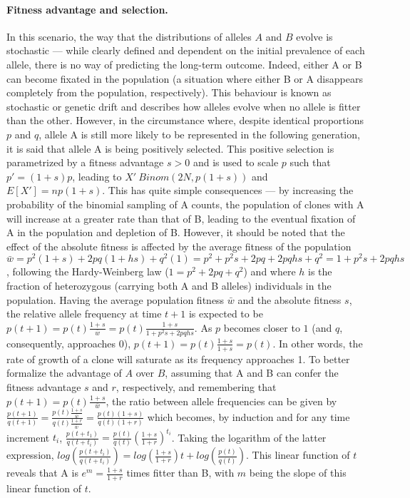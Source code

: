 \paragraph{Fitness advantage and selection.} In this scenario, the way that the distributions of alleles $A$ and $B$ evolve is stochastic --- while clearly defined and dependent on the initial prevalence of each allele, there is no way of predicting the long-term outcome. Indeed, either A or B can become fixated in the population (a situation where either B or A disappears completely from the population, respectively). This behaviour is known as stochastic or genetic drift and describes how alleles evolve when no allele is fitter than the other. However, in the circumstance where, despite identical proportions $p$ and $q$, allele A is still more likely to be represented in the following generation, it is said that allele A is being positively selected. This positive selection is parametrized by a fitness advantage $s > 0$ and is used to scale $p$ such that $p' = (1+s)p$, leading to $X' ~ Binom(2N,p(1+s))$ and $E[X'] = np(1+s)$. This has quite simple consequences --- by increasing the probability of the binomial sampling of A counts, the population of clones with A will increase at a greater rate than that of B, leading to the eventual fixation of A in the population and depletion of B. However, it should be noted that the effect of the absolute fitness is affected by the average fitness of the population $\bar{w} = p^2(1+s) + 2pq(1+hs) + q^2(1) = p^2 + p^2s + 2pq + 2pqhs + q^2 = 1 + p^2s + 2pqhs$, following the Hardy-Weinberg law ($1 = p^2 + 2pq + q^2$) and where $h$ is the fraction of heterozygous (carrying both A and B alleles) individuals in the population. Having the average population fitness $\bar{w}$ and the absolute fitness $s$, the relative allele frequency at time $t+1$ is expected to be $p(t+1) = p(t)\frac{1+s}{\bar{w}} = p(t)\frac{1+s}{1 + p^2s + 2pqhs}$. As $p$ becomes closer to $1$ (and $q$, consequently, approaches $0$), $p(t+1) = p(t)\frac{1+s}{1+s} = p(t)$. In other words, the rate of growth of a clone will saturate as its frequency approaches 1. To better formalize the advantage of $A$ over $B$, assuming that A and B can confer the fitness advantage $s$ and $r$, respectively, and remembering that $p(t+1) = p(t)\frac{1+s}{\bar{w}}$, the ratio between allele frequencies can be given by $\frac{p(t+1)}{q(t+1)} = \frac{p(t)\frac{1+s}{\bar{w}}}{q(t)\frac{1+r}{\bar{w}}} = \frac{p(t)(1+s)}{q(t)(1+r)}$ which becomes, by induction and for any time increment $t_i$, $\frac{p(t+t_1)}{q(t+t_i)}=\frac{p(t)}{q(t)}(\frac{1+s}{1+r})^{t_i}$. Taking the logarithm of the latter expression, $log(\frac{p(t+t_i)}{q(t+t_i)}) = log(\frac{1+s}{1+r})t + log(\frac{p(t)}{q(t)})$. This linear function of $t$ reveals that A is $e^{m} = \frac{1+s}{1+r}$ times fitter than B, with $m$ being the slope of this linear function of $t$. 

